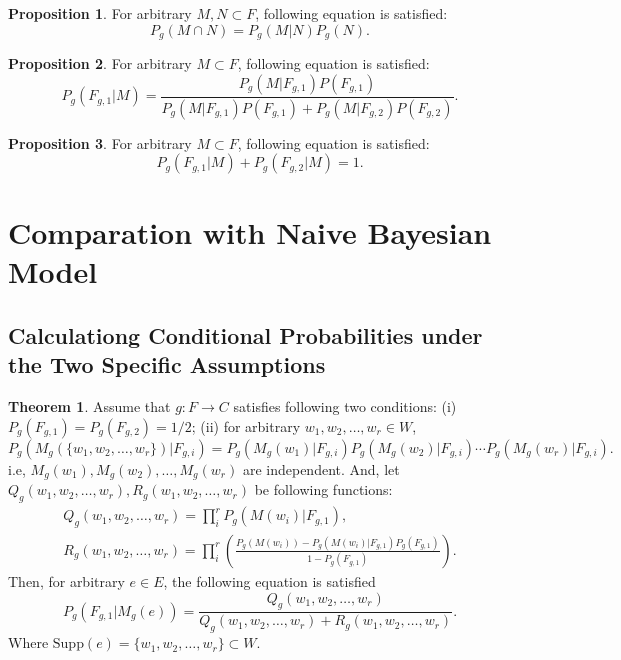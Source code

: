 \documentclass[11pt, a4note]{article}
\theoremstyle{definition}
\newtheorem{proposition}{Proposition}[section]
\newtheorem{theorem}{Theorem}[section]
\begin{document}
\begin{proposition}
For arbitrary $ M, N \subset F $, following equation is satisfied:
\begin{equation}
P_{g}(M \cap N) = P_{g}(M | N)P_{g}(N).
\end{equation}
\end{proposition}

\begin{proposition}
For arbitrary $ M \subset F $, following equation is satisfied:
\begin{equation}
P_{g}(F_{g,1}|M) = \frac{P_{g}(M|F_{g,1})P(F_{g,1})}{P_{g}(M|F_{g,1})P(F_{g,1}) + P_{g}(M|F_{g,2})P(F_{g,2})}.
\end{equation}
\end{proposition}

\begin{proposition}
For arbitrary $ M \subset F $, following equation is satisfied:
\begin{equation}
P_{g}(F_{g,1}|M) + P_{g}(F_{g,2}|M) = 1.
\end{equation}
\end{proposition}

\section{Comparation with Naive Bayesian Model}

\subsection{Calculationg Conditional Probabilities under the Two Specific Assumptions}

\begin{theorem}
Assume that $ g : F \to C $ satisfies following two conditions:
(i) $ P_{g}(F_{g,1}) = P_{g}(F_{g,2}) = 1/2 $;
(ii) for arbitrary $ w_{1}, w_{2}, \dots, w_{r} \in W $,
\begin{equation}
P_{g}(M_{g}(\{ w_{1}, w_{2}, \dots, w_{r} \})|F_{g,i})
= P_{g}(M_{g}(w_{1})|F_{g,i})P_{g}(M_{g}(w_{2})|F_{g,i}) \cdots P_{g}(M_{g}(w_{r})|F_{g,i}).
\end{equation}
i.e, $ M_{g}(w_{1}), M_{g}(w_{2}), \dots, M_{g}(w_{r}) $ are independent.
And, let $ Q_{g}(w_{1}, w_{2}, \dots, w_{r}), R_{g}(w_{1}, w_{2}, \dots, w_{r}) $ be following functions:
\begin{eqnarray}
Q_{g}(w_{1}, w_{2}, \dots, w_{r}) = \prod_{i}^{r}P_{g}(M(w_{i})|F_{g,1}), \\
R_{g}(w_{1}, w_{2}, \dots, w_{r}) = \prod_{i}^{r}(\frac{P_{g}(M(w_{i})) - P_{g}(M(w_{i})|F_{g,1})P_{g}(F_{g,1})}{1 - P_{g}(F_{g,1})}).
\end{eqnarray}
Then, for arbitrary $ e \in E $, the following equation is satisfied
\begin{equation}
P_{g}(F_{g,1}|M_{g}(e))
= \frac{Q_{g}(w_{1}, w_{2}, \dots, w_{r})}{Q_{g}(w_{1}, w_{2}, \dots, w_{r}) + R_{g}(w_{1}, w_{2}, \dots, w_{r})}.
\end{equation}
Where $ \mathrm{Supp}(e) = \{ w_{1}, w_{2}, \dots, w_{r} \} \subset W $.
\end{theorem}
\end{document}
